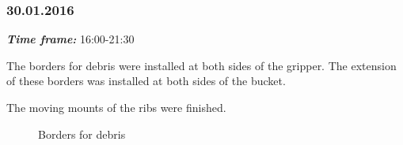 \subsubsection{30.01.2016}
\textit{\textbf{Time frame:}} 16:00-21:30

The borders for debris were installed at both sides of the gripper. The extension of these borders was installed at both sides of the bucket.

The moving mounts of the ribs were finished.

\begin{figure}[H]
	\begin{minipage}[h]{0.47\linewidth}
		\caption{Borders for debris}
	\end{minipage}
	\hfill
	\begin{minipage}[h]{0.47\linewidth}

\end{minipage}
\end{figure}
